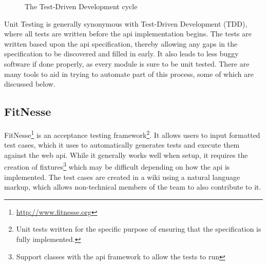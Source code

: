 \begin{figure}[ht]
\caption{The Test-Driven Development cycle}
\end{figure}


Unit Testing is generally synonymous with Test-Driven Development (TDD), where all tests are written before the api implementation begins. The tests are written based upon the api specification, thereby allowing any gaps in the specification to be discovered and filled in early. It also leads to less buggy software if done properly, as every module is sure to be unit tested. There are many tools to aid in trying to automate part of this process, some of which are discussed below.

\subsection{FitNesse}

FitNesse\footnote{\url{http://www.fitnesse.org}} is an acceptance testing framework\footnote{Unit tests written for the specific purpose of ensuring that the specification is fully implemented.}. It allows users to input formatted test cases, which it uses to automatically generates tests and execute them against the web api. While it generally works well when setup, it requires the creation of fixtures\footnote{Support classes with the api framework to allow the tests to run} which may be difficult depending on how the api is implemented. The test cases are created in a wiki using a natural language markup, which allows non-technical members of the team to also contribute to it.

